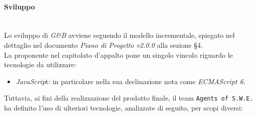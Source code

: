 \paragraph{Sviluppo} \-\\
\label{Progettazione_Sviluppo}
Lo sviluppo di \textit{G\&B} avviene seguendo il modello incrementale, spiegato nel dettaglio nel documento \textit{Piano di Progetto v2.0.0} alla sezione §4.\\
La proponente nel capitolato d'appalto pone un singolo vincolo riguardo le tecnologie da utilizzare:
\begin{itemize}
	\item \textit{JavaScrip}t: in particolare nella sua declinazione nota come \textit{ECMAScript 6}\glossario.
\end{itemize}
Tuttavia, ai fini della realizzazione del prodotto finale, il team \texttt{Agents of S.W.E.} ha definito l'uso di ulteriori tecnologie, analizzate di seguito, per scopi diversi:
